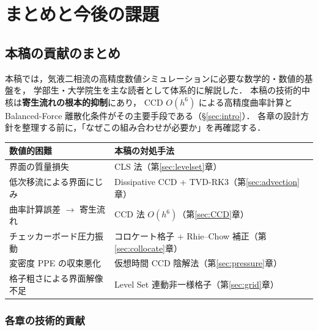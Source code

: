 \section{まとめと今後の課題}
\label{sec:conclusion}

\subsection{本稿の貢献のまとめ}
\label{sec:contribution_summary}

本稿では，気液二相流の高精度数値シミュレーションに必要な数学的・数値的基盤を，
学部生・大学院生を主な読者として体系的に解説した．
本稿の技術的中核は\textbf{寄生流れの根本的抑制}にあり，
CCD $O(h^6)$ による高精度曲率計算と Balanced-Force 離散化条件がその主要手段である（§\ref{sec:intro}）．
各章の設計方針を整理する前に，「なぜこの組み合わせが必要か」を再確認する．

\begin{center}
\renewcommand{\arraystretch}{1.4}
\begin{tabular}{>{\raggedright}p{60mm}>{\raggedright\arraybackslash}p{70mm}}
\hline
\textbf{数値的困難} & \textbf{本稿の対処手法} \\
\hline
界面の質量損失       & CLS 法（第\ref{sec:levelset}章）\\
低次移流による界面にじみ & Dissipative CCD + TVD-RK3（第\ref{sec:advection}章）\\
曲率計算誤差 $\to$ 寄生流れ & CCD 法 $O(h^6)$（第\ref{sec:CCD}章）\\
チェッカーボード圧力振動 & コロケート格子 + Rhie--Chow 補正（第\ref{sec:collocate}章）\\
変密度 PPE の収束悪化 & 仮想時間 CCD 陰解法（第\ref{sec:pressure}章）\\
格子粗さによる界面解像不足 & Level Set 連動非一様格子（第\ref{sec:grid}章）\\
\hline
\end{tabular}
\end{center}

\subsubsection{各章の技術的貢献}

